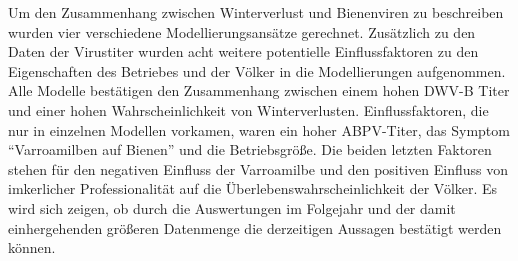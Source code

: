 \newline
 Um den Zusammenhang zwischen Winterverlust und Bienenviren zu beschreiben wurden vier verschiedene Modellierungsansätze gerechnet. Zusätzlich zu den Daten der Virustiter wurden acht weitere potentielle Einflussfaktoren zu den Eigenschaften des Betriebes und der Völker in die Modellierungen aufgenommen. Alle Modelle bestätigen den Zusammenhang zwischen einem hohen DWV-B Titer und einer hohen Wahrscheinlichkeit von Winterverlusten. Einflussfaktoren, die nur in einzelnen Modellen vorkamen, waren ein hoher ABPV-Titer, das Symptom \enquote{Varroamilben auf Bienen} und die Betriebsgröße. Die beiden letzten Faktoren stehen für den negativen Einfluss der Varroamilbe und den positiven Einfluss von imkerlicher Professionalität auf die Überlebenswahrscheinlichkeit der Völker.
 Es wird sich zeigen, ob durch die Auswertungen im Folgejahr und der damit einhergehenden größeren Datenmenge die derzeitigen Aussagen bestätigt werden können.